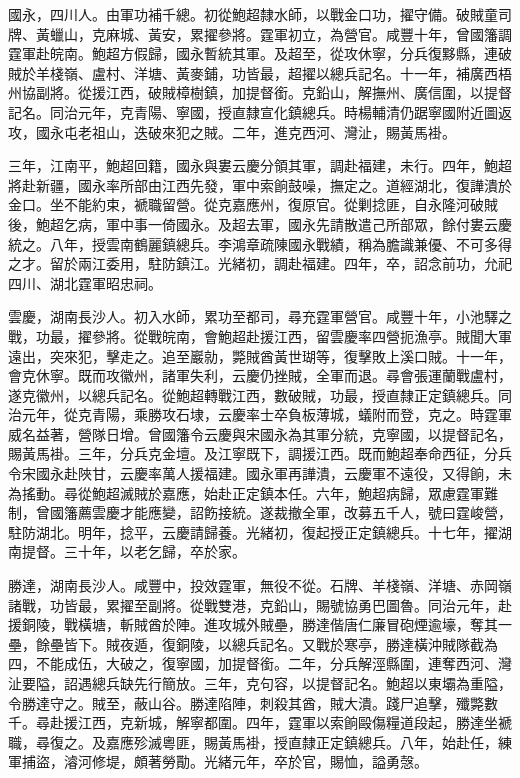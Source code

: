 \begin{pinyinscope}
國永，四川人。由軍功補千總。初從鮑超隸水師，以戰金口功，擢守備。破賊童司牌、黃蠟山，克麻城、黃安，累擢參將。霆軍初立，為營官。咸豐十年，曾國籓調霆軍赴皖南。鮑超方假歸，國永暫統其軍。及超至，從攻休寧，分兵復黟縣，連破賊於羊棧嶺、盧村、洋塘、黃麥鋪，功皆最，超擢以總兵記名。十一年，補廣西梧州協副將。從援江西，破賊樟樹鎮，加提督銜。克鉛山，解撫州、廣信圍，以提督記名。同治元年，克青陽、寧國，授直隸宣化鎮總兵。時楊輔清仍踞寧國附近圖返攻，國永屯老祖山，迭破來犯之賊。二年，進克西河、灣沚，賜黃馬褂。

三年，江南平，鮑超回籍，國永與婁云慶分領其軍，調赴福建，未行。四年，鮑超將赴新疆，國永率所部由江西先發，軍中索餉鼓噪，撫定之。道經湖北，復譁潰於金口。坐不能約束，褫職留營。從克嘉應州，復原官。從剿捻匪，自永隆河破賊後，鮑超乞病，軍中事一倚國永。及超去軍，國永先請散遣己所部眾，餘付婁云慶統之。八年，授雲南鶴麗鎮總兵。李鴻章疏陳國永戰績，稱為膽識兼優、不可多得之才。留於兩江委用，駐防鎮江。光緒初，調赴福建。四年，卒，詔念前功，允祀四川、湖北霆軍昭忠祠。

雲慶，湖南長沙人。初入水師，累功至都司，尋充霆軍營官。咸豐十年，小池驛之戰，功最，擢參將。從戰皖南，會鮑超赴援江西，留雲慶率四營扼漁亭。賊聞大軍遠出，突來犯，擊走之。追至巖勍，斃賊酋黃世瑚等，復擊敗上溪口賊。十一年，會克休寧。既而攻徽州，諸軍失利，云慶仍挫賊，全軍而退。尋會張運蘭戰盧村，遂克徽州，以總兵記名。從鮑超轉戰江西，數破賊，功最，授直隸正定鎮總兵。同治元年，從克青陽，乘勝攻石埭，云慶率士卒負板薄城，蟻附而登，克之。時霆軍威名益著，營隊日增。曾國籓令云慶與宋國永為其軍分統，克寧國，以提督記名，賜黃馬褂。三年，分兵克金壇。及江寧既下，調援江西。既而鮑超奉命西征，分兵令宋國永赴陜甘，云慶率萬人援福建。國永軍再譁潰，云慶軍不遠役，又得餉，未為搖動。尋從鮑超滅賊於嘉應，始赴正定鎮本任。六年，鮑超病歸，眾慮霆軍難制，曾國籓薦雲慶才能應變，詔飭接統。遂裁撤全軍，改募五千人，號曰霆峻營，駐防湖北。明年，捻平，云慶請歸養。光緒初，復起授正定鎮總兵。十七年，擢湖南提督。三十年，以老乞歸，卒於家。

勝達，湖南長沙人。咸豐中，投效霆軍，無役不從。石牌、羊棧嶺、洋塘、赤岡嶺諸戰，功皆最，累擢至副將。從戰雙港，克鉛山，賜號協勇巴圖魯。同治元年，赴援銅陵，戰橫塘，斬賊酋於陣。進攻城外賊壘，勝達偕唐仁廉冒砲煙逾壕，奪其一壘，餘壘皆下。賊夜遁，復銅陵，以總兵記名。又戰於寒亭，勝達橫沖賊隊截為四，不能成伍，大破之，復寧國，加提督銜。二年，分兵解涇縣圍，連奪西河、灣沚要隘，詔遇總兵缺先行簡放。三年，克句容，以提督記名。鮑超以東壩為重隘，令勝達守之。賊至，蔽山谷。勝達陷陣，刺殺其酋，賊大潰。踐尸追擊，殲斃數千。尋赴援江西，克新城，解寧都圍。四年，霆軍以索餉毆傷糧道段起，勝達坐褫職，尋復之。及嘉應殄滅粵匪，賜黃馬褂，授直隸正定鎮總兵。八年，始赴任，練軍捕盜，濬河修堤，頗著勞勩。光緒元年，卒於官，賜恤，謚勇愨。


\end{pinyinscope}

